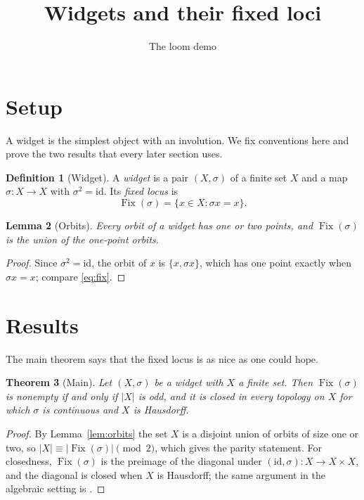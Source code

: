 \documentclass{amsart}
\title{Widgets and their fixed loci}
\author{The loom demo}
\providecommand{\uses}[1]{}
\theoremstyle{plain}
\newtheorem{theorem}{Theorem}[section]
\newtheorem{lemma}[theorem]{Lemma}
\theoremstyle{definition}
\newtheorem{definition}[theorem]{Definition}
\theoremstyle{remark}
\newcommand{\Fix}{\operatorname{Fix}}
\begin{document}
\maketitle

\section{Setup}\label{dm-0010}

A widget is the simplest object with an involution. We fix conventions here and prove the two results that every later section uses.


\begin{definition}[Widget]\label{dm-0001}\label{def:widget}
A \emph{widget} is a pair $(X,\sigma)$ of a finite set $X$ and a map $\sigma\colon X\to X$ with $\sigma^2=\mathrm{id}$. Its \emph{fixed locus} is
\begin{equation}\label{eq:fix}
\Fix(\sigma) = \{x\in X : \sigma x = x\}.
\end{equation}
\end{definition}



\begin{lemma}[Orbits]\label{dm-0002}\label{lem:orbits}
Every orbit of a widget has one or two points, and $\Fix(\sigma)$ is the union of the one-point orbits.
\end{lemma}
\begin{proof}
Since $\sigma^2=\mathrm{id}$, the orbit of $x$ is $\{x,\sigma x\}$, which has one point exactly when $\sigma x = x$; compare \eqref{eq:fix}.
\end{proof}


\section{Results}\label{dm-0011}

The main theorem says that the fixed locus is as nice as one could hope.


\begin{theorem}[Main]\label{dm-0003}
Let $(X,\sigma)$ be a widget with $X$ a finite set. Then $\Fix(\sigma)$ is nonempty if and only if $|X|$ is odd, and it is closed in every topology on $X$ for which $\sigma$ is continuous and $X$ is Hausdorff.
\end{theorem}
\begin{proof}
\uses{dm-0002}
By Lemma~\ref{lem:orbits} the set $X$ is a disjoint union of orbits of size one or two, so $|X| \equiv |\Fix(\sigma)| \pmod 2$, which gives the parity statement. For closedness, $\Fix(\sigma)$ is the preimage of the diagonal under $(\mathrm{id},\sigma)\colon X\to X\times X$, and the diagonal is closed when $X$ is Hausdorff; the same argument in the algebraic setting is \cite[Proposition 3.2]{Man12}.
\end{proof}
\end{document}
